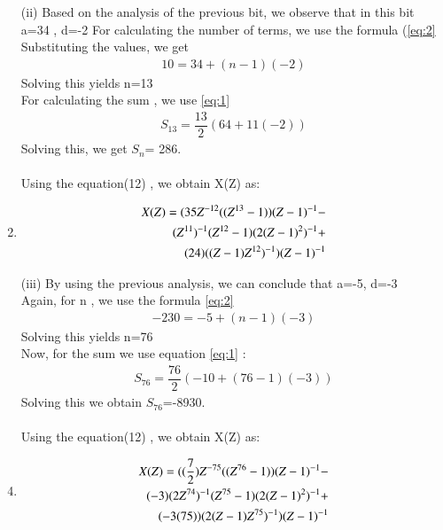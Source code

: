 \documentclass[journal,12pt,twocolumn]{IEEEtran}
\theoremstyle{remark}
\begin{document}
\begin{enumerate}
\item[(ii)]
\vspace{0.5cm}
Based on the analysis of the previous bit, we observe that in this bit \\ a=34 , d=-2
For calculating the number of terms, we use the formula (\eqref{eq:2}\\
Substituting the values, we get
\begin{align}
     10 = 34 + (n-1)(-2)
     \end{align}
Solving this yields n=13\\
For calculating the sum , we use \eqref{eq:1}
\begin{align}
 S_{13} = \dfrac{13}{2}(64+11(-2))
 \end{align}
 Solving this, we get $S_n$= 286.\\\\
 Using the equation(12) , we obtain X(Z) as:\\
  \item 
  \begin{align}      
  \notag X(Z)= (35Z^{-12}((Z^{13}-1))(Z-1)^{-1}-\\
  \notag (Z^{11})^{-1}(Z^{12}-1)(2(Z-1)^{2})^{-1}+\\
  \notag (24)((Z-1)Z^{12})^{-1})(Z-1)^{-1}
    \end{align}


\item[(iii)]  
\vspace{0.5cm}
By using the previous analysis, we can conclude that a=-5, d=-3\\
Again, for n , we use the formula \eqref{eq:2}
\begin{align}
-230= -5+(n-1)(-3)
\end{align}
Solving this yields n=76\\
Now, for the sum we use equation \eqref{eq:1} :\\
\begin{align}
    S_{76}=\dfrac{76}{2}(-10+(76-1)(-3))
    \end{align}
Solving this we obtain $S_{76}$=-8930.\\\\
 Using the equation(12) , we obtain X(Z) as:\\
 \item 
 \begin{align}
 \notag X(Z) =((\dfrac{7}{2})Z^{-75}((Z^{76}-1))(Z-1)^{-1}-\\
 \notag(-3)(2Z^{74})^{-1}(Z^{75}-1)(2(Z-1)^{2})^{-1}+\\
 \notag(-3(75))(2(Z-1)Z^{75})^{-1})(Z-1)^{-1}
 \end{align}


 






\end{enumerate}



 

 
\end{document}
